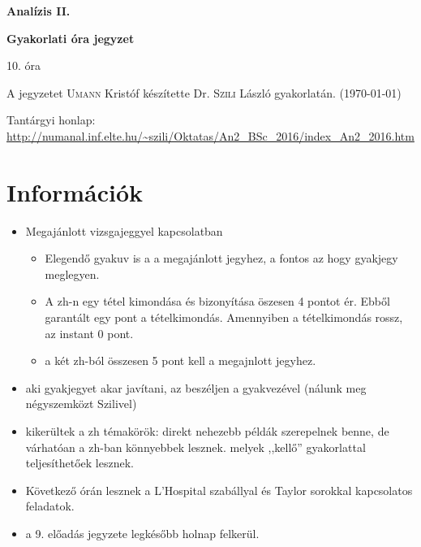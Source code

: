 \documentclass[a4paper,11.5pt]{article}
\begin{document}
	\setlength\parindent{0pt}
	\def\s{\hspace{0.2mm}\vphantom{\beta}}
	\def\Z{\mathbb{Z}}
	\def\Q{\mathbb{Q}}
	\def\R{\mathbb{R}}
	\def\C{\mathbb{C}}
	\def\N{\mathbb{N}}
	\def\Rn{\mathbb{R}^{n}}
	\def\Ra{\overline{\mathbb{R}}}
	\def\sume{\displaystyle\sum_{n=1}^{+\infty}}
	\def\sumn{\displaystyle\sum_{n=0}^{+\infty}}
	\def\biz{\emph{Bizonyítás:\ }}
	\def\narrow{\underset{n\rightarrow+\infty}{\longrightarrow}}
	\def\limn{\displaystyle\lim_{n\to +\infty}}
	\def\limx{\displaystyle\lim_{x\to +\infty}}
	
	\theoremstyle{definition}
	\newtheorem{theorem}{Tétel}[subsection] %
	
	\theoremstyle{definition}
	\newtheorem{definition}[theorem]{Definíció} %
	\newtheorem{example}[theorem]{Példa} %
	\newtheorem{task}[theorem]{Feladat} %
	\newtheorem{note}[theorem]{Megjegyzés} %
	\newtheorem{revision}[theorem]{Emlékeztető} %
	\begin{center}
		{\LARGE \textbf{Analízis II.}}
		
		{\large \textbf{Gyakorlati óra jegyzet}}
		
		10. óra
	\end{center}
	A jegyzetet \textsc{Umann} Kristóf készítette Dr. \textsc{Szili} László gyakorlatán. (\today)
	
	Tantárgyi honlap: \url{http://numanal.inf.elte.hu/~szili/Oktatas/An2_BSc_2016/index_An2_2016.htm}
	\section{Információk}
	\begin{itemize}
		\item Megajánlott vizsgajeggyel kapcsolatban
		\begin{itemize}
			\item Elegendő gyakuv is a a megajánlott jegyhez, a fontos az hogy gyakjegy meglegyen.
			\item A zh-n egy tétel kimondása és bizonyítása öszesen 4 pontot ér. Ebből garantált egy pont a tételkimondás. Amennyiben a tételkimondás rossz, az instant 0 pont.
			\item a két zh-ból összesen 5 pont kell a megajnlott jegyhez.
		\end{itemize}
		\item aki gyakjegyet akar javítani, az beszéljen a gyakvezével (nálunk meg négyszemközt Szilivel)
		\item kikerültek a zh témakörök: direkt nehezebb példák szerepelnek benne, de várhatóan a zh-ban könnyebbek lesznek. melyek ,,kellő'' gyakorlattal teljesíthetőek lesznek.
		\item Következő órán lesznek a L'Hospital szabállyal és Taylor sorokkal kapcsolatos feladatok.
		\item a 9. előadás jegyzete legkésőbb holnap felkerül.
	\end{itemize}
\end{document}
